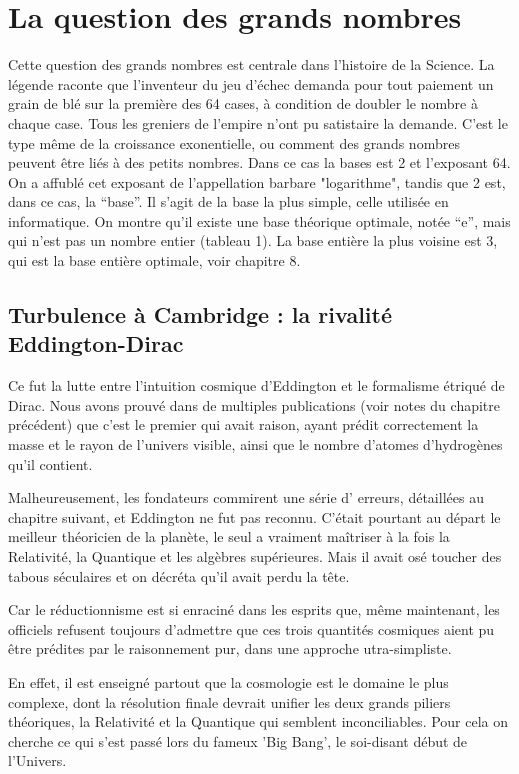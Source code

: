 \documentclass[a4paper,12pt]{article}
\begin{document}
 
 
 
 
 
\section{La question des grands nombres} 

Cette question des grands nombres est centrale dans l'histoire de la Science. La légende raconte que l'inventeur du jeu d'échec demanda pour tout paiement un grain de blé sur la première des 64 cases, à condition de doubler le nombre à chaque case. Tous les greniers de l'empire n'ont pu satistaire la demande. C'est le type m\^eme de la croissance exonentielle, ou comment des grands nombres peuvent être liés à des petits nombres. Dans ce cas la bases est 2 et l'exposant 64. On a affublé cet exposant de l'appellation barbare "logarithme", tandis que 2 est, dans ce cas, la ``base''. Il s'agit de la base la plus simple, celle utilisée en informatique. On montre qu'il existe une base théorique optimale, notée ``e'', mais qui n'est pas un nombre entier (tableau 1). La base entière la plus voisine est 3, qui est la base entière optimale, voir chapitre 8.    

\subsection{Turbulence à Cambridge : la rivalité Eddington-Dirac}
       Ce fut la lutte entre l'intuition cosmique d'Eddington et le formalisme étriqué de Dirac. Nous avons prouvé dans de multiples publications (voir notes du chapitre précédent) que c'est le premier qui avait raison, ayant prédit correctement la masse et le rayon de l'univers visible, ainsi que le nombre d'atomes d'hydrogènes qu'il contient. 

Malheureusement, les fondateurs commirent une série d' erreurs, détaillées au chapitre suivant, et Eddington ne fut pas reconnu. C'était pourtant au départ le meilleur théoricien de la planète, le seul a vraiment ma\^itriser à la fois la Relativité, la Quantique et les algèbres supérieures. Mais il avait osé toucher des tabous séculaires et on décréta qu'il avait perdu la tête.

Car le réductionnisme est si enraciné dans les esprits que, m\^eme maintenant, les officiels refusent toujours d'admettre que ces trois quantités cosmiques aient pu être prédites par le raisonnement pur, dans une approche utra-simpliste.

En effet, il est enseigné partout que la cosmologie est le domaine le plus complexe, dont la résolution finale devrait unifier les deux grands piliers théoriques, la Relativité et la Quantique qui semblent inconciliables. Pour cela on cherche ce qui s'est passé lors du fameux 'Big Bang', le soi-disant début de l'Univers.
\end{document}
